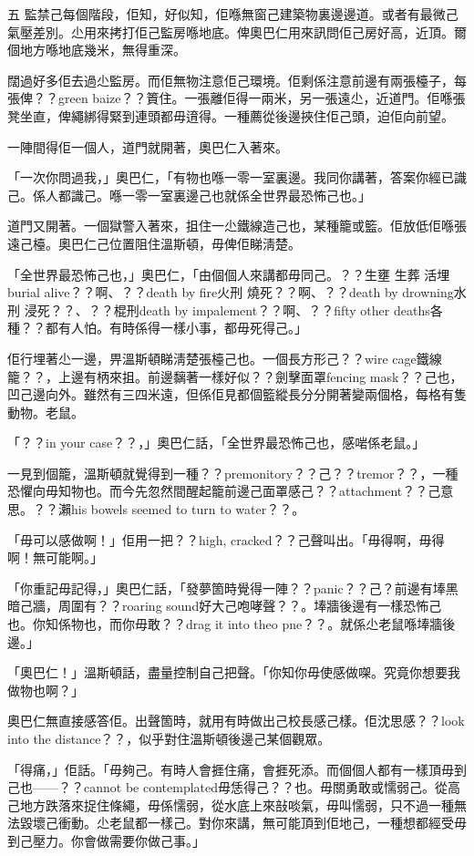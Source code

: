 五
監禁己每個階段，佢知，好似知，佢喺無窗己建築物裏邊邊道。或者有最微己氣壓差別。尐用來拷打佢己監房喺地底。俾奧巴仁用來訊問佢己房好高，近頂。爾個地方喺地底幾米，無得重深。

闊過好多佢去過尐監房。而佢無物注意佢己環境。佢剩係注意前邊有兩張檯子，每張俾？？green baize？？篢住。一張離佢得一兩米，另一張遠尐，近道門。佢喺張凳坐直，俾繩綁得緊到連頭都毋逳得。一種薦從後邊挾住佢己頭，迫佢向前望。

一陣間得佢一個人，道門就開著，奧巴仁入著來。

「一次你問過我，」奧巴仁，「有物也喺一零一室裏邊。我同你講著，答案你經已識己。係人都識己。喺一零一室裏邊己也就係全世界最恐怖己也。」

道門又開著。一個獄警入著來，抯住一尐鐵線造己也，某種籠或籃。佢放低佢喺張遠己檯。奧巴仁己位置阻住溫斯頓，毋俾佢睇淸楚。

「全世界最恐怖己也，」奧巴仁，「由個個人來講都毋同己。？？生壅 生葬 活埋burial alive？？啊、？？death by fire火刑 燒死？？啊、？？death by drowning水刑 浸死？？、？？棍刑death by impalement？？啊、？？fifty other deaths各種？？都有人怕。有時係得一樣小事，都毋死得己。」

佢行埋著尐一邊，畀溫斯頓睇淸楚張檯己也。一個長方形己？？wire cage鐵線籠？？，上邊有柄來抯。前邊黐著一樣好似？？劍擊面罩fencing mask？？己也，凹己邊向外。雖然有三四米遠，但係佢見都個籃縱長分分開著變兩個格，每格有隻動物。老鼠。

「？？in your case？？，」奧巴仁話，「全世界最恐怖己也，感啱係老鼠。」

一見到個籠，溫斯頓就覺得到一種？？premonitory？？己？？tremor？？，一種恐懼向毋知物也。而今先忽然間醒起籠前邊己面罩感己？？attachment？？己意思。？？瀨his bowels seemed to turn to water？？。

「毋可以感做啊！」佢用一把？？high, cracked？？己聲叫出。「毋得啊，毋得啊！無可能啊。」

「你重記毋記得，」奧巴仁話，「發夢箇時覺得一陣？？panic？？己？前邊有埲黑暗己牆，周圍有？？roaring sound好大己咆哮聲？？。埲牆後邊有一樣恐怖己也。你知係物也，而你毋敢？？drag it into theo pne？？。就係尐老鼠喺埲牆後邊。」

「奧巴仁！」溫斯頓話，盡量控制自己把聲。「你知你毋使感做㗎。究竟你想要我做物也啊？」

奧巴仁無直接感答佢。出聲箇時，就用有時做出己校長感己樣。佢沈思感？？look into the distance？？，似乎對住溫斯頓後邊己某個觀眾。

「得痛，」佢話。「毋夠己。有時人會捱住痛，會捱死添。而個個人都有一樣頂毋到己也——？？cannot be contemplated毋恁得己？？也。毋關勇敢或懦弱己。從高己地方跌落來捉住條繩，毋係懦弱，從水底上來㪗啖氣，毋叫懦弱，只不過一種無法毀壞己衝動。尐老鼠都一樣己。對你來講，無可能頂到佢地己，一種想都經受毋到己壓力。你會做需要你做己事。」

